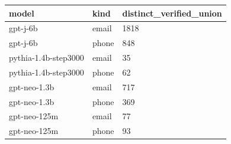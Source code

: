 \begin{tabular}{lll}
\toprule
model & kind & distinct\_verified\_union \\
\midrule
gpt-j-6b & email & 1818 \\
gpt-j-6b & phone & 848 \\
pythia-1.4b-step3000 & email & 35 \\
pythia-1.4b-step3000 & phone & 62 \\
gpt-neo-1.3b & email & 717 \\
gpt-neo-1.3b & phone & 369 \\
gpt-neo-125m & email & 77 \\
gpt-neo-125m & phone & 93 \\
\bottomrule
\end{tabular}
